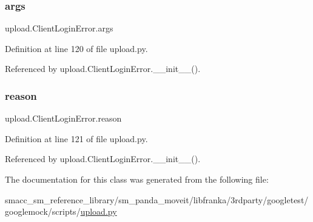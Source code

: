 \subsubsection{\texorpdfstring{args}{args}}
{\footnotesize\ttfamily upload.\+Client\+Login\+Error.\+args}



Definition at line 120 of file upload.\+py.



Referenced by upload.\+Client\+Login\+Error.\+\_\+\+\_\+init\+\_\+\+\_\+().

\mbox{\label{classupload_1_1ClientLoginError_ae0555feb182d89d1e4d7944afbfe14e5}} 
\subsubsection{\texorpdfstring{reason}{reason}}
{\footnotesize\ttfamily upload.\+Client\+Login\+Error.\+reason}



Definition at line 121 of file upload.\+py.



Referenced by upload.\+Client\+Login\+Error.\+\_\+\+\_\+init\+\_\+\+\_\+().



The documentation for this class was generated from the following file\+:\begin{DoxyCompactItemize}
\item 
smacc\+\_\+sm\+\_\+reference\+\_\+library/sm\+\_\+panda\+\_\+moveit/libfranka/3rdparty/googletest/googlemock/scripts/\hyperlink{googlemock_2scripts_2upload_8py}{upload.\+py}\end{DoxyCompactItemize}
